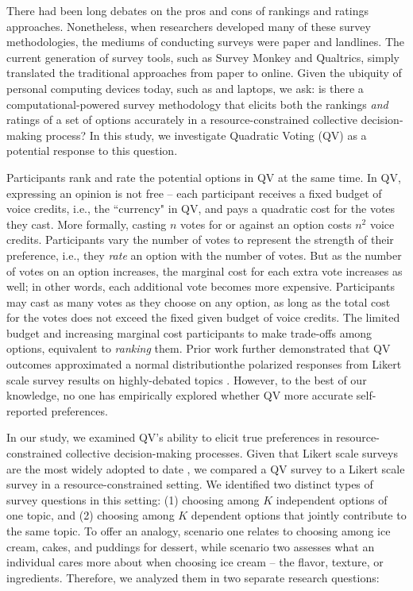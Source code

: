 There had been long debates on the pros and cons of rankings and ratings approaches. Nonetheless, when researchers developed many of these survey methodologies, the mediums of conducting surveys were paper and landlines. The current generation of survey tools, such as Survey Monkey and Qualtrics, simply translated the traditional approaches from paper to online. Given the ubiquity of personal computing devices today, such as  and laptops, we ask: is there a computational-powered survey methodology that elicits both the rankings \textit{and} ratings of a set of options accurately in a resource-constrained collective decision-making process? In this study, we investigate Quadratic Voting (QV) \cite{posner2018radical} as a potential response to this question. 

Participants rank and rate the potential options in QV at the same time. In QV, expressing an opinion is not free -- each participant receives a fixed budget of voice credits, i.e., the ``currency" in QV, and pays a quadratic cost for the votes they cast. More formally, casting $n$ votes for or against an option costs $n^2$ voice credits. Participants vary the number of votes to represent the strength of their preference, i.e., they \textit{rate} an option with the number of votes. But as the number of votes on an option increases, the marginal cost for each extra vote increases as well; in other words, each additional vote becomes more expensive. Participants may cast as many votes as they choose on any option, as long as the total cost for the votes does not exceed the fixed given budget of voice credits. The limited budget and increasing marginal cost  participants to make trade-offs among options, equivalent to \textit{ranking} them. Prior work further demonstrated that QV outcomes approximated a normal distributionthe polarized responses from Likert scale survey results on highly-debated topics \cite{quarfoot2017quadratic}. However, to the best of our knowledge, no one has empirically explored whether QV  more accurate self-reported preferences.

In our study, we examined QV's ability to elicit true preferences in resource-constrained collective decision-making processes. Given that Likert scale surveys are the most widely adopted to date \cite{moors2016two}, we compared a QV survey to a Likert scale survey \cite{likert1932technique} in a resource-constrained setting. We identified two distinct types of survey questions in this setting: (1) choosing among $K$ independent options of one topic, and (2) choosing among $K$ dependent options that jointly contribute to the same topic. To offer an analogy, scenario one relates to choosing among ice cream, cakes, and puddings for dessert, while scenario two assesses what an individual cares more about when choosing ice cream -- the flavor, texture, or ingredients. Therefore, we analyzed them in two separate research questions:


